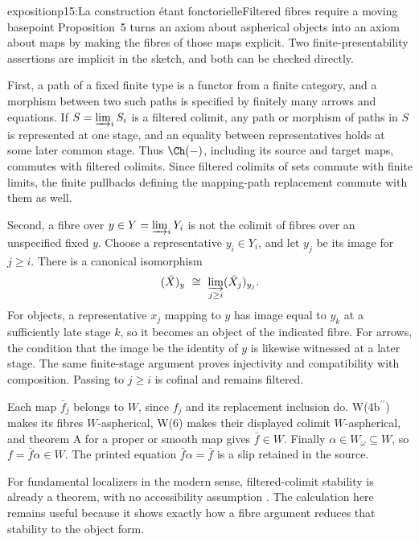 \begin{dcomment}{exposition}{p15:La construction étant fonctorielle}{Filtered fibres require a moving basepoint}
Proposition~5 turns an axiom about aspherical objects into an axiom about maps by making the fibres of those maps explicit. Two finite-presentability assertions are implicit in the sketch, and both can be checked directly.

First, a path of a fixed finite type is a functor from a finite category, and a morphism between two such paths is specified by finitely many arrows and equations. If \(S=\varinjlim_i S_i\) is a filtered colimit, any path or morphism of paths in \(S\) is represented at one stage, and an equality between representatives holds at some later common stage. Thus \(\Ch(-)\), including its source and target maps, commutes with filtered colimits. Since filtered colimits of sets commute with finite limits, the finite pullbacks defining the mapping-path replacement commute with them as well.

Second, a fibre over \(y\in Y=\varinjlim_iY_i\) is not the colimit of fibres over an unspecified fixed \(y\). Choose a representative \(y_i\in Y_i\), and let \(y_j\) be its image for \(j\geq i\). There is a canonical isomorphism
\[
 (\bar X)_y\ \cong\
 \varinjlim_{j\geq i}(\bar X_j)_{y_j}.
\]
For objects, a representative \(x_j\) mapping to \(y\) has image equal to \(y_k\) at a sufficiently late stage \(k\), so it becomes an object of the indicated fibre. For arrows, the condition that the image be the identity of \(y\) is likewise witnessed at a later stage. The same finite-stage argument proves injectivity and compatibility with composition. Passing to \(j\geq i\) is cofinal and remains filtered.

Each map \(\bar f_j\) belongs to \(W\), since \(f_j\) and its replacement inclusion do. W(4b\(^{\prime\prime}\)) makes its fibres \(W\)-aspherical, W(6) makes their displayed colimit \(W\)-aspherical, and theorem A for a proper or smooth map gives \(\bar f\in W\). Finally \(\alpha\in W_\omega\subseteq W\), so \(f=\bar f\alpha\in W\). The printed equation \(\bar f\alpha=\bar f\) is a slip retained in the source.

For fundamental localizers in the modern sense, filtered-colimit stability is already a theorem, with no accessibility assumption \citep[Corollary~4.2.22]{Cisinski2006}. The calculation here remains useful because it shows exactly how a fibre argument reduces that stability to the object form.
\end{dcomment}

